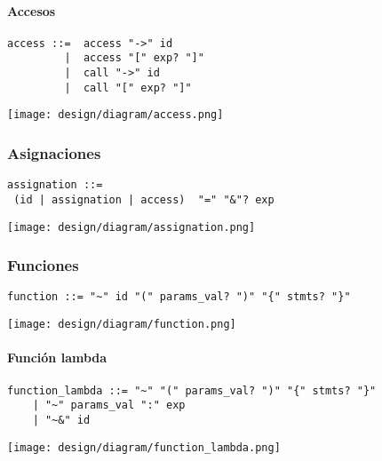 \paragraph{Accesos}
\begin{multicols}{2}
\begin{lstlisting}[style=nonumbers, basicstyle=\tiny]      
access ::=  access "->" id
         |  access "[" exp? "]"
         |  call "->" id
         |  call "[" exp? "]"
\end{lstlisting}  
\columnbreak	
\begin{center}
\texttt{[image: design/diagram/access.png]} 
\end{center}
\end{multicols}

\subsubsection{Asignaciones}
\begin{multicols}{2}
\begin{lstlisting}[style=nonumbers, basicstyle=\tiny]      
assignation ::=   
 (id | assignation | access)  "=" "&"? exp
\end{lstlisting}  
\columnbreak	
\begin{center}
\texttt{[image: design/diagram/assignation.png]} 
\end{center}
\end{multicols}
\subsubsection{Funciones}
\begin{lstlisting}[style=nonumbers]
function ::= "~" id "(" params_val? ")" "{" stmts? "}"
\end{lstlisting}
\begin{center}
\texttt{[image: design/diagram/function.png]} 
\end{center}
\pagebreak

\paragraph {Función lambda}
\begin{lstlisting}[style=nonumbers]
function_lambda ::= "~" "(" params_val? ")" "{" stmts? "}"
    | "~" params_val ":" exp
    | "~&" id
\end{lstlisting}
\begin{center}
\texttt{[image: design/diagram/function\_lambda.png]} 
\end{center}
